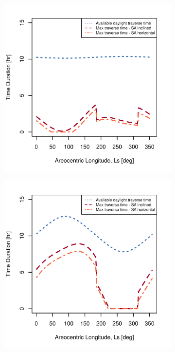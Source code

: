 \documentclass[twocolumn,letterpaper]{IEEEAerospaceCLS}  %
\newlength{\subfigureWidth}
\newlength{\graphicsHeight}
\begin{document}
\begin{figure}[h]
\captionsetup[subfigure]{justification=centering}
  \centering
  \setlength{\subfigureWidth}{0.24\textwidth}
  \setlength{\graphicsHeight}{40mm}
  \begin{subfigure}[t]{\subfigureWidth}
    \centering
    \includegraphics[height=\graphicsHeight]{figures/plots/ianichaos-75w-max-traverse-durations-for-solar-cell-coverage-area-15m2.png}
    \label{fig:plot:sub:final-maximum-traverse-durations-iani-chaos}
  \end{subfigure}\hfill
  \begin{subfigure}[t]{\subfigureWidth}
    \centering
    \includegraphics[height=\graphicsHeight]{figures/plots/ismeniuscavus-75w-max-traverse-durations-for-solar-cell-coverage-area-24m2.png}

\end{subfigure}
\end{figure}
\end{document}
